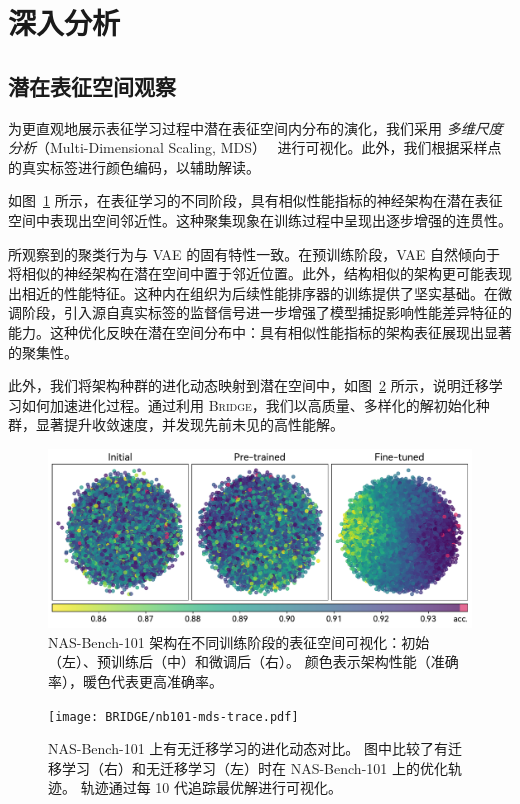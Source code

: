 \documentclass[../main.tex]{subfiles}
\begin{document}
\section{深入分析}

\subsection{潜在表征空间观察}\label{sec:repre-space-analysis}

为更直观地展示表征学习过程中潜在表征空间内分布的演化，我们采用 \textit{多维尺度分析}（Multi-Dimensional Scaling, MDS）~\cite{DOUGLASCARROLL1998179} 进行可视化。此外，我们根据采样点的真实标签进行颜色编码，以辅助解读。

如图~\ref{fig:nb101-mds} 所示，在表征学习的不同阶段，具有相似性能指标的神经架构在潜在表征空间中表现出空间邻近性。这种聚集现象在训练过程中呈现出逐步增强的连贯性。

所观察到的聚类行为与 VAE 的固有特性一致。在预训练阶段，VAE 自然倾向于将相似的神经架构在潜在空间中置于邻近位置。此外，结构相似的架构更可能表现出相近的性能特征。这种内在组织为后续性能排序器的训练提供了坚实基础。在微调阶段，引入源自真实标签的监督信号进一步增强了模型捕捉影响性能差异特征的能力。这种优化反映在潜在空间分布中：具有相似性能指标的架构表征展现出显著的聚集性。

此外，我们将架构种群的进化动态映射到潜在空间中，如图~\ref{fig:nb101-mds-trace} 所示，说明迁移学习如何加速进化过程。通过利用 \textsc{Bridge}，我们以高质量、多样化的解初始化种群，显著提升收敛速度，并发现先前未见的高性能解。

\begin{figure}[htbp]
	\centering
	\includegraphics[width=.85\linewidth]{BRIDGE/nb101-mds.pdf}
	\caption{NAS-Bench-101 架构在不同训练阶段的表征空间可视化：初始（左）、预训练后（中）和微调后（右）。
		颜色表示架构性能（准确率），暖色代表更高准确率。
	}\label{fig:nb101-mds}
\end{figure}

\begin{figure}[htbp]
	\centering
	\texttt{[image: BRIDGE/nb101-mds-trace.pdf]}
	\caption{NAS-Bench-101 上有无迁移学习的进化动态对比。
		图中比较了有迁移学习（右）和无迁移学习（左）时在 NAS-Bench-101 上的优化轨迹。
		轨迹通过每 10 代追踪最优解进行可视化。
	}\label{fig:nb101-mds-trace}
\end{figure}
\end{document}
